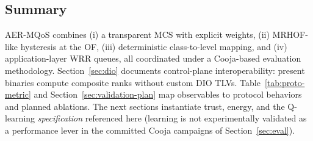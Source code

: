 \subsection{Summary}
AER-MQoS combines (i) a transparent MCS with explicit weights, (ii) MRHOF-like hysteresis at the OF, (iii) deterministic class-to-level mapping, and (iv) application-layer WRR queues, all coordinated under a Cooja-based evaluation methodology. Section~\ref{sec:dio} documents control-plane interoperability: present binaries compute composite ranks without custom DIO TLVs. Table~\ref{tab:proto-metric} and Section~\ref{sec:validation-plan} map observables to protocol behaviors and planned ablations. The next sections instantiate trust, energy, and the Q-learning \emph{specification} referenced here (learning is not experimentally validated as a performance lever in the committed Cooja campaigns of Section~\ref{sec:eval}).
